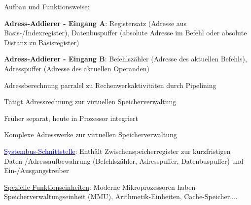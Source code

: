 \begin{items}
	\item Aufbau und Funktionsweise:
	\begin{items}
		\item \textbf{Adress-Addierer - Eingang A}: Registersatz (Adresse aus Basis-/Indexregister), Datenbuspuffer (absolute Adresse im Befehl oder absolute Distanz zu Basisregister)
		\item \textbf{Adress-Addierer - Eingang B}: Befehlszähler (Adresse des aktuellen Befehls), Adresspuffer (Adresse des aktuellen Operanden)
		\item Adressberechnung parralel zu Rechenwerkaktivitäten durch Pipelining
		\item Tätigt Adressrechnung zur virtuellen Speicherverwaltung
		\item Früher separat, heute in Prozessor integriert
		\item Komplexe Adresswerke zur virtuellen Speicherverwaltung
	\end{items}

	\item \underline{\textcolor{blue}{Systembus-Schnittstelle}}: Enthält Zwischenspeicherregister zur kurzfristigen Daten-/Adressaufbewahrung (Befehlszähler, Adresspuffer, Datenbuspuffer) und Ein-/Ausgangstreiber

	\item \underline{Spezielle Funktionseinheiten}: Moderne Mikroprozessoren haben Speicherverwaltungseinheit (MMU), Arithmetik-Einheiten, Cache-Speicher,...

\end{items}